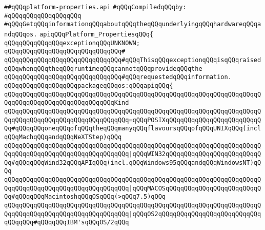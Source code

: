 \label{src/lib/std/src/nj/platform-properties.api}
\verb|##qQQqplatform-properties.api|\newline
\newline
\verb|#qQQqCompiledqQQqby:|\newline
\verb|#qQQqqQQqqQQqqQQqqQQq|\newline
\newline
\newline
\newline
\verb|#qQQqGetqQQqinformationqQQqaboutqQQqtheqQQqunderlyingqQQqhardwareqQQqandqQQqos.|\newline
\newline
\verb|apiqQQqPlatform_PropertiesqQQq{|\newline
\newline
\verb|qQQqqQQqqQQqqQQqexceptionqQQqUNKNOWN;|\newline
\verb|qQQqqQQqqQQqqQQqqQQqqQQqqQQqqQQq#|\newline
\verb|qQQqqQQqqQQqqQQqqQQqqQQqqQQqqQQq#qQQqThisqQQqexceptionqQQqisqQQqraisedqQQqwhenqQQqtheqQQqruntimeqQQqcannotqQQqprovideqQQqthe|\newline
\verb|qQQqqQQqqQQqqQQqqQQqqQQqqQQqqQQq#qQQqrequestedqQQqinformation.|\newline
\newline
\newline
\verb|qQQqqQQqqQQqqQQqqQQqpackageqQQqos:qQQqapiqQQq{|\newline
\verb|qQQqqQQqqQQqqQQqqQQqqQQqqQQqqQQqqQQqqQQqqQQqqQQqqQQqqQQqqQQqqQQqqQQqqQQqqQQqqQQqqQQqqQQqqQQqqQQqqQQqKind|\newline
\verb|qQQqqQQqqQQqqQQqqQQqqQQqqQQqqQQqqQQqqQQqqQQqqQQqqQQqqQQqqQQqqQQqqQQqqQQqqQQqqQQqqQQqqQQqqQQqqQQqqQQqqQQq=qQQqPOSIXqQQqqQQqqQQqqQQqqQQqqQQqqQQq#qQQqqQQqoneqQQqofqQQqtheqQQqmanyqQQqflavoursqQQqofqQQqUNIXqQQq(inclqQQqMachqQQqandqQQqNeXTStep)qQQq|\newline
\verb|qQQqqQQqqQQqqQQqqQQqqQQqqQQqqQQqqQQqqQQqqQQqqQQqqQQqqQQqqQQqqQQqqQQqqQQqqQQqqQQqqQQqqQQqqQQqqQQqqQQqqQQq|\verb#|qQQqWIN32qQQqqQQqqQQqqQQqqQQqqQQqqQQq#\verb|#qQQqqQQqWind32qQQqAPIqQQq(incl.qQQqWindows95qQQqandqQQqWindowsNT)qQQq|\newline
\verb|qQQqqQQqqQQqqQQqqQQqqQQqqQQqqQQqqQQqqQQqqQQqqQQqqQQqqQQqqQQqqQQqqQQqqQQqqQQqqQQqqQQqqQQqqQQqqQQqqQQqqQQq|\verb#|qQQqMACOSqQQqqQQqqQQqqQQqqQQqqQQqqQQq#\verb|#qQQqqQQqMacintoshqQQqOSqQQq(>qQQq7.5)qQQq|\newline
\verb|qQQqqQQqqQQqqQQqqQQqqQQqqQQqqQQqqQQqqQQqqQQqqQQqqQQqqQQqqQQqqQQqqQQqqQQqqQQqqQQqqQQqqQQqqQQqqQQqqQQqqQQq|\verb#|qQQqOS2qQQqqQQqqQQqqQQqqQQqqQQqqQQqqQQqqQQq#\verb|#qQQqqQQqIBM'sqQQqOS/2qQQq|\newline
